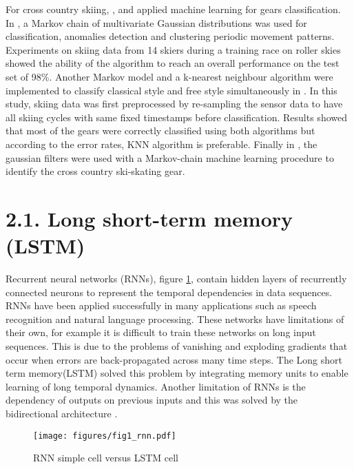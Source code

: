 \documentclass[12pt,a4paper]{article}
\begin{document}
For cross country skiing, \cite{holst2013classification}, \cite{ristnercomparison} and \cite{stoggl2014automatic} applied machine learning for gears classification. In \cite{holst2013classification}, a Markov chain of multivariate Gaussian distributions was used for classification, anomalies detection and clustering periodic movement patterns.  Experiments on skiing data from 14 skiers during a training race on roller skies showed the ability of the algorithm to reach an overall performance on the test set of 98\%.  Another Markov model and a k-nearest neighbour algorithm were implemented to classify classical style and free style simultaneously in \cite{ristnercomparison}. In this study, skiing data was first preprocessed by re-sampling the sensor data to have all skiing cycles with same fixed timestamps before classification. Results showed that most of the gears were correctly classified using both algorithms but according to the error rates, KNN algorithm is preferable. Finally in  \cite{stoggl2014automatic}, the gaussian filters were used with a Markov-chain machine learning procedure to identify the cross country ski-skating gear.


\section*{2.1. Long short-term memory (LSTM) }  
Recurrent neural networks (RNNs), figure \ref{rnn}, contain hidden layers of recurrently connected neurons to represent the temporal dependencies in data sequences. RNNs have been applied successfully in many applications such as speech recognition  and natural language processing. These networks have limitations of their own, for example it is difficult to train these networks on long input sequences. This is due to  the problems of vanishing and exploding gradients that  occur when errors are back-propagated across many time steps. The Long short term memory(LSTM) solved this problem by integrating memory units to enable learning of long temporal dynamics. Another limitation of RNNs is the dependency of outputs on previous inputs and this was solved by the bidirectional architecture \cite{graves2005framewise}. 

\begin{figure}[h!]
\centering
\texttt{[image: figures/fig1\_rnn.pdf]}
\caption{RNN simple cell versus LSTM cell \cite{donahue2015long}}
\label{rnn}
\end{figure}
\end{document}

